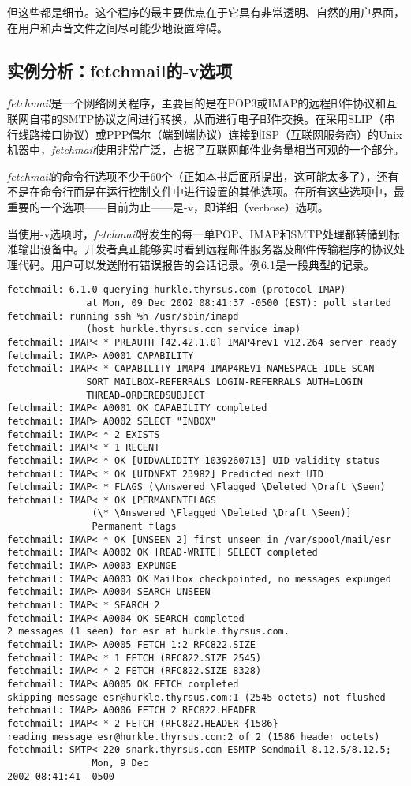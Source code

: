 \documentclass[12pt,oneside]{ctexbook}
\begin{document}
\begin{common-format}
但这些都是细节。这个程序的最主要优点在于它具有非常透明、自然的用户界面，在用户和声音文件之间尽可能少地设置障碍。

\subsection{实例分析：fetchmail的-v选项}
\textit{fetchmail}是一个网络网关程序，主要目的是在POP3或IMAP的远程邮件协议和互联网自带的SMTP协议之间进行转换，从而进行电子邮件交换。在采用SLIP（串行线路接口协议）或PPP偶尔（端到端协议）连接到ISP（互联网服务商）的Unix机器中，\textit{fetchmail}使用非常广泛，占据了互联网邮件业务量相当可观的一个部分。

\textit{fetchmail}的命令行选项不少于60个（正如本书后面所提出，这可能太多了），还有不是在命令行而是在运行控制文件中进行设置的其他选项。在所有这些选项中，最重要的一个选项——目前为止——是-v，即详细（verbose）选项。

当使用-v选项时，\textit{fetchmail}将发生的每一单POP、IMAP和SMTP处理都转储到标准输出设备中。开发者真正能够实时看到远程邮件服务器及邮件传输程序的协议处理代码。用户可以发送附有错误报告的会话记录。例6.1是一段典型的记录。


\begin{Verbatim}[label=例6.1  fetchmail的-v记录实例]
fetchmail: 6.1.0 querying hurkle.thyrsus.com (protocol IMAP)
              at Mon, 09 Dec 2002 08:41:37 -0500 (EST): poll started
fetchmail: running ssh %h /usr/sbin/imapd
              (host hurkle.thyrsus.com service imap)
fetchmail: IMAP< * PREAUTH [42.42.1.0] IMAP4rev1 v12.264 server ready
fetchmail: IMAP> A0001 CAPABILITY
fetchmail: IMAP< * CAPABILITY IMAP4 IMAP4REV1 NAMESPACE IDLE SCAN
              SORT MAILBOX-REFERRALS LOGIN-REFERRALS AUTH=LOGIN
              THREAD=ORDEREDSUBJECT
fetchmail: IMAP< A0001 OK CAPABILITY completed
fetchmail: IMAP> A0002 SELECT "INBOX"
fetchmail: IMAP< * 2 EXISTS
fetchmail: IMAP< * 1 RECENT
fetchmail: IMAP< * OK [UIDVALIDITY 1039260713] UID validity status
fetchmail: IMAP< * OK [UIDNEXT 23982] Predicted next UID
fetchmail: IMAP< * FLAGS (\Answered \Flagged \Deleted \Draft \Seen)
fetchmail: IMAP< * OK [PERMANENTFLAGS
               (\* \Answered \Flagged \Deleted \Draft \Seen)]
               Permanent flags
fetchmail: IMAP< * OK [UNSEEN 2] first unseen in /var/spool/mail/esr
fetchmail: IMAP< A0002 OK [READ-WRITE] SELECT completed
fetchmail: IMAP> A0003 EXPUNGE
fetchmail: IMAP< A0003 OK Mailbox checkpointed, no messages expunged
fetchmail: IMAP> A0004 SEARCH UNSEEN
fetchmail: IMAP< * SEARCH 2
fetchmail: IMAP< A0004 OK SEARCH completed
2 messages (1 seen) for esr at hurkle.thyrsus.com.
fetchmail: IMAP> A0005 FETCH 1:2 RFC822.SIZE
fetchmail: IMAP< * 1 FETCH (RFC822.SIZE 2545)
fetchmail: IMAP< * 2 FETCH (RFC822.SIZE 8328)
fetchmail: IMAP< A0005 OK FETCH completed
skipping message esr@hurkle.thyrsus.com:1 (2545 octets) not flushed
fetchmail: IMAP> A0006 FETCH 2 RFC822.HEADER
fetchmail: IMAP< * 2 FETCH (RFC822.HEADER {1586}
reading message esr@hurkle.thyrsus.com:2 of 2 (1586 header octets)
fetchmail: SMTP< 220 snark.thyrsus.com ESMTP Sendmail 8.12.5/8.12.5;
               Mon, 9 Dec
2002 08:41:41 -0500


\end{Verbatim}
\end{common-format}
\end{document}

